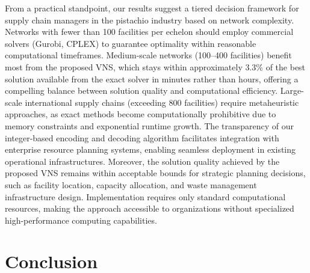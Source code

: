 \documentclass[preprint,12pt,authoryear]{elsarticle}
\begin{document}
From a practical standpoint, our results suggest a tiered decision framework for supply chain managers in the pistachio industry based on network complexity. 
Networks with fewer than 100 facilities per echelon should employ commercial solvers (Gurobi, CPLEX) to guarantee optimality within reasonable computational timeframes. 
Medium-scale networks (100--400 facilities) benefit most from the proposed VNS, which stays within approximately 3.3\% of the best solution available from the exact solver in minutes rather than hours, 
offering a compelling balance between solution quality and computational efficiency. Large-scale international supply chains (exceeding 800 facilities) require metaheuristic 
approaches, as exact methods become computationally prohibitive due to memory constraints and exponential runtime growth. The transparency of our integer-based encoding and 
decoding algorithm facilitates integration with enterprise resource planning systems, enabling seamless deployment in existing operational infrastructures. Moreover, the solution 
quality achieved by the proposed VNS remains within acceptable bounds for strategic planning decisions, such as facility location, capacity allocation, and waste management 
infrastructure design. Implementation requires only standard computational resources, making the approach accessible to organizations without specialized high-performance computing capabilities.

\section{Conclusion}
\label{sec:conclusion}
\end{document}
